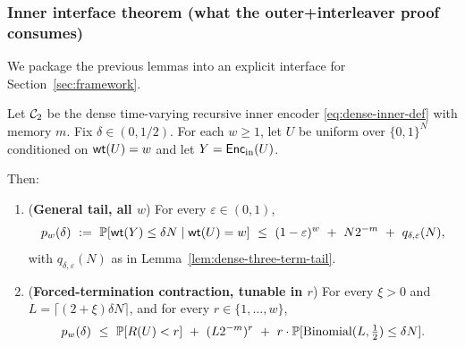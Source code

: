 \subsubsection{Inner interface theorem (what the outer+interleaver proof consumes)}
\label{subsec:inner-dense-interface}

We package the previous lemmas into an explicit interface for Section~\ref{sec:framework}.

\begin{theorem}
\label{thm:inner-dense-interface}
Let ${\mathcal{C}_2}$ be the dense time-varying recursive inner encoder \eqref{eq:dense-inner-def} with memory $m$.
Fix $\delta\in(0,1/2)$.
For each $w\ge 1$, let $U$ be uniform over $\{0,1\}^N$ conditioned on $\mathsf{wt}(U)=w$ and let $Y=\mathsf{Enc}_{\mathrm{in}}(U)$.

Then:
\begin{enumerate}
\item (\textbf{General tail, all $w$}) For every $\varepsilon\in(0,1)$,
\[
p_w(\delta)\ :=\ \mathbb{P}[\mathsf{wt}(Y)\le \delta N\mid \mathsf{wt}(U)=w]
\ \le\
(1-\varepsilon)^w\ +\ N2^{-m}\ +\ q_{\delta,\varepsilon}(N),
\]
with $q_{\delta,\varepsilon}(N)$ as in Lemma~\ref{lem:dense-three-term-tail}.
\item (\textbf{Forced-termination contraction, tunable in $r$}) For every $\xi>0$ and
$L=\lceil(2+\xi)\delta N\rceil$, and for every $r\in\{1,\dots,w\}$,
\[
p_w(\delta)
\ \le\
\mathbb{P}[R(U)<r]\ +\ (L2^{-m})^{r}\ +\ r\cdot \mathbb{P}[\mathrm{Binomial}(L,\tfrac12)\le \delta N].
\]
\end{enumerate}
\end{theorem}


